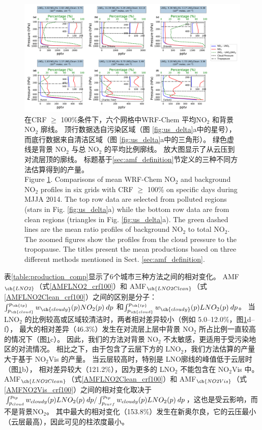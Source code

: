 \begin{figure}[!htbp]
\includegraphics[width=16cm]{./figures/us_bkgd_comp.pdf}
\caption{在CRF $\geq$ 100\%条件下，六个网格中WRF-Chem 平均NO$_\textrm{2}$ 和背景 NO$_\textrm{2}$ 廓线。
顶行数据选自污染区域（图 \ref{fig:us_delta}a中的星号），而底行数据来自清洁区域（图 \ref{fig:us_delta}a中的三角形）。
绿色虚线是背景 NO$_\textrm{2}$ 与总 NO$_\textrm{2}$ 的平均比例廓线。
放大图显示了从云压到对流层顶的廓线。
标题基于\ref{sec:amf_definition}节定义的三种不同方法估算得到的产量。\\
Figure \ref{fig:us_bkgd_comp}. Comparisons of mean WRF-Chem NO$_\textrm{2}$ and background NO$_\textrm{2}$ profiles in six grids with CRF $\geq$ 100\% on specific days during MJJA 2014.
The top row data are selected from polluted regions (stars in Fig. \ref{fig:us_delta}a) while the bottom row data are from clean regions (triangles in Fig. \ref{fig:us_delta}a).
The green dashed lines are the mean ratio profiles of background NO$_\textrm{2}$ to total NO$_\textrm{2}$.
The zoomed figures show the profiles from the cloud pressure to the tropopause.
The titles present the mean productions based on three different methods mentioned in Sect. \ref{sec:amf_definition}.}
\label{fig:us_bkgd_comp}
\end{figure}


表\ref{table:production_comp}显示了6个城市三种方法之间的相对变化。
AMF$_{\ch{LNO2}}$（式\ref{AMFLNO2_crf100}）和 AMF$_{\ch{LNO2Clean}}$（式\ref{AMFLNO2Clean_crf100}）之间的区别是分子：
$\int_{p_{\ch{cloud}}}^{p_{\ch{tp}}} w_{\ch{cloudy}}(p) NO_2(p) \: dp$
和$\int_{p_{\ch{cloud}}}^{p_{\ch{tp}}} w_{\ch{cloudy}}(p) LNO_2(p) \: dp$。
当 LNO$_2$ 的比例较高或区域较清洁时，两者相对差异较小（例如 5.0--12.0\%，图\ref{fig:us_bkgd_comp}d--f），
最大的相对差异（46.3\%）发生在对流层上层中背景 NO$_2$ 所占比例一直较高的情况下（图\ref{fig:us_bkgd_comp}c）。
因此，我们的方法对背景 NO$_2$ 不太敏感，更适用于受污染地区的对流情况。
相比之下，由于包含了云层下方的 LNO$_2$，我们方法估算的产量大于基于 NO$_2$Vis 的产量。
当云层较高时，特别是 LNO廓线的峰值低于云层时（图\ref{fig:us_bkgd_comp}b），
相对差异较大（121.2\%），因为更多的 LNO$_2$ 不能包含在 NO$_2$Vis 中。
AMF$_{\ch{LNO2Clean}}$（式\ref{AMFLNO2Clean_crf100}）和 AMF$_{\ch{NO2Vis}}$（式\ref{AMFNO2Vis_crf100}）之间的相对变化取决于
$\int_{p_{\textrm cloud}}^{p_{\textrm tp}} w_{\textrm cloudy}(p) LNO_2(p) \: dp / \int_{p_{\textrm surf}}^{p_{\textrm tp}} w_{\textrm cloudy}(p) LNO_2(p) \: dp$，这也是受云影响，而不是背景NO$_2$。
其中最大的相对变化（153.8\%）发生在新奥尔良，它的云压最小（云层最高），因此可见的柱浓度最小。

